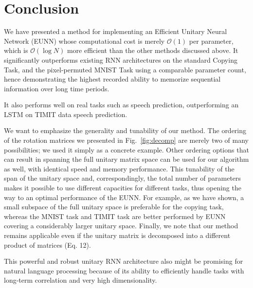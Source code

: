\section{Conclusion}

We have presented a method for implementing an Efficient Unitary Neural Network (EUNN) whose computational cost is merely $\mathcal{O}(1)$ per parameter, which is $\mathcal{O}(\log N)$ more efficient than the other methods discussed above. It significantly outperforms existing RNN architectures on the standard Copying Task, and the pixel-permuted MNIST Task using a comparable parameter count, hence demonstrating the highest recorded ability to memorize sequential information over long time periods. 

It also performs well on real tasks such as speech prediction, outperforming an LSTM on TIMIT data speech prediction.

We want to emphasize the generality and tunability of our method. The ordering of the rotation matrices we presented in Fig.~\ref{fig:decomp} are merely two of many possibilities; we used it simply as a concrete example. Other ordering options that can result in spanning the full unitary matrix space can be used for our algorithm as well, with identical speed and memory performance. This tunability of the span of the unitary space and, correspondingly, the total number of parameters makes it possible to use different capacities for different tasks, thus opening the way to an optimal performance of the EUNN. For example, as we have shown, a small subspace of the full unitary space is preferable for the copying task, whereas the MNIST task and TIMIT task are better performed by EUNN covering a considerably larger unitary space. Finally, we note that our method remains applicable even if the unitary matrix is decomposed into a different product of matrices (Eq. 12).

This powerful and robust unitary RNN architecture also might be promising for natural language processing because of its ability to efficiently handle tasks with long-term correlation and very high dimensionality. 


